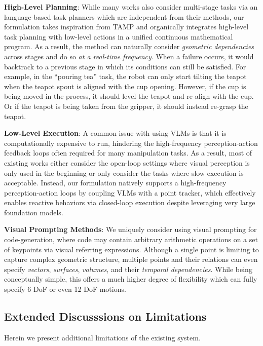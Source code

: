 \textbf{High-Level Planning}: While many works also consider multi-stage tasks via an language-based task planners which are independent from their methods, our formulation takes inspiration from TAMP and organically integrates high-level task planning with low-level actions in a unified continuous mathematical program. As a result, the method can naturally consider \emph{geometric dependencies} across stages and do so \emph{at a real-time frequency}. When a failure occurs, it would backtrack to a previous stage in which its conditions can still be satisfied. For example, in the ``pouring tea'' task, the robot can only start tilting the teapot when the teapot spout is aligned with the cup opening. However, if the cup is being moved in the process, it should level the teapot and re-align with the cup. Or if the teapot is being taken from the gripper, it should instead re-grasp the teapot.

\textbf{Low-Level Execution}: A common issue with using VLMs is that it is computationally expensive to run, hindering the high-frequency perception-action feedback loops often required for many manipulation tasks. As a result, most of existing works either consider the open-loop settings where visual perception is only used in the beginning or only consider the tasks where slow execution is acceptable. Instead, our formulation natively supports a high-frequency perception-action loops by coupling VLMs with a point tracker, which effectively enables reactive behaviors via closed-loop execution despite leveraging very large foundation models.

\textbf{Visual Prompting Methods}: We uniquely consider using visual prompting for code-generation, where code may contain arbitrary arithmetic operations on a set of keypoints via visual referring expressions. Although a single point is limiting to capture complex geometric structure, multiple points and their relations can even specify \emph{vectors}, \emph{surfaces}, \emph{volumes}, and their \emph{temporal dependencies}. While being conceptually simple, this offers a much higher degree of flexibility which can fully specify 6 DoF or even 12 DoF motions.

\subsection{Extended Discusssions on Limitations}\label{sec:limitations}

Herein we present additional limitations of the existing system.

